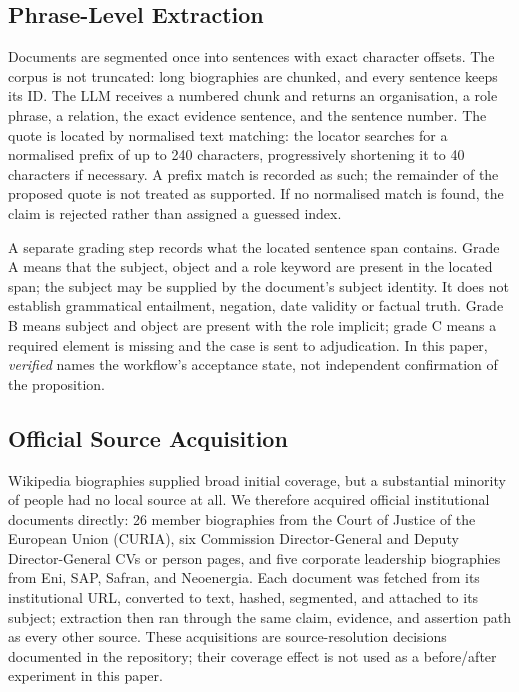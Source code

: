 \documentclass[11pt,a4paper]{article}
\begin{document}
\subsection{Phrase-Level Extraction}

Documents are segmented once into sentences with exact character offsets. The corpus is not truncated: long biographies are chunked, and every sentence keeps its ID. The LLM receives a numbered chunk and returns an organisation, a role phrase, a relation, the exact evidence sentence, and the sentence number. The quote is located by normalised text matching: the locator searches for a normalised prefix of up to 240 characters, progressively shortening it to 40 characters if necessary. A prefix match is recorded as such; the remainder of the proposed quote is not treated as supported. If no normalised match is found, the claim is rejected rather than assigned a guessed index.

A separate grading step records what the located sentence span contains. Grade A means that the subject, object and a role keyword are present in the located span; the subject may be supplied by the document's subject identity. It does not establish grammatical entailment, negation, date validity or factual truth. Grade B means subject and object are present with the role implicit; grade C means a required element is missing and the case is sent to adjudication. In this paper, \emph{verified} names the workflow's acceptance state, not independent confirmation of the proposition.

\subsection{Official Source Acquisition}

Wikipedia biographies supplied broad initial coverage, but a substantial minority of people had no local source at all. We therefore acquired official institutional documents directly: 26 member biographies from the Court of Justice of the European Union (CURIA), six Commission Director-General and Deputy Director-General CVs or person pages, and five corporate leadership biographies from Eni, SAP, Safran, and Neoenergia. Each document was fetched from its institutional URL, converted to text, hashed, segmented, and attached to its subject; extraction then ran through the same claim, evidence, and assertion path as every other source. These acquisitions are source-resolution decisions documented in the repository; their coverage effect is not used as a before/after experiment in this paper.
\end{document}
